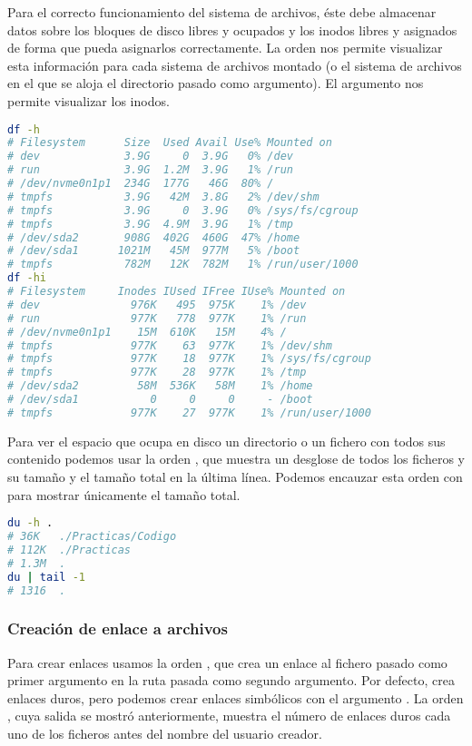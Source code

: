 Para el correcto funcionamiento del sistema de archivos, éste debe almacenar datos sobre los bloques de disco libres y ocupados y los inodos libres y asignados de forma que pueda asignarlos correctamente.
La orden  nos permite visualizar esta información para cada sistema de archivos montado (o el sistema de archivos en el que se aloja el directorio pasado como argumento).
El argumento  nos permite visualizar los inodos.

\begin{lstlisting}[language=Bash]
df -h
# Filesystem      Size  Used Avail Use% Mounted on
# dev             3.9G     0  3.9G   0% /dev
# run             3.9G  1.2M  3.9G   1% /run
# /dev/nvme0n1p1  234G  177G   46G  80% /
# tmpfs           3.9G   42M  3.8G   2% /dev/shm
# tmpfs           3.9G     0  3.9G   0% /sys/fs/cgroup
# tmpfs           3.9G  4.9M  3.9G   1% /tmp
# /dev/sda2       908G  402G  460G  47% /home
# /dev/sda1      1021M   45M  977M   5% /boot
# tmpfs           782M   12K  782M   1% /run/user/1000
df -hi
# Filesystem     Inodes IUsed IFree IUse% Mounted on
# dev              976K   495  975K    1% /dev
# run              977K   778  977K    1% /run
# /dev/nvme0n1p1    15M  610K   15M    4% /
# tmpfs            977K    63  977K    1% /dev/shm
# tmpfs            977K    18  977K    1% /sys/fs/cgroup
# tmpfs            977K    28  977K    1% /tmp
# /dev/sda2         58M  536K   58M    1% /home
# /dev/sda1           0     0     0     - /boot
# tmpfs            977K    27  977K    1% /run/user/1000
\end{lstlisting}

Para ver el espacio que ocupa en disco un directorio o un fichero con todos sus contenido podemos usar la orden , que muestra un desglose de todos los ficheros y su tamaño y el tamaño total en la última línea.
Podemos encauzar esta orden con  para mostrar únicamente el tamaño total.

\begin{lstlisting}[language=Bash]
du -h .
# 36K	./Practicas/Codigo
# 112K	./Practicas
# 1.3M	.
du | tail -1
# 1316	.
\end{lstlisting}

\subsubsection{Creación de enlace a archivos}

Para crear enlaces usamos la orden , que crea un enlace al fichero pasado como primer argumento en la ruta pasada como segundo argumento.
Por defecto,  crea enlaces duros, pero podemos crear enlaces simbólicos con el argumento .
La orden , cuya salida se mostró anteriormente, muestra el número de enlaces duros cada uno de los ficheros antes del nombre del usuario creador.

